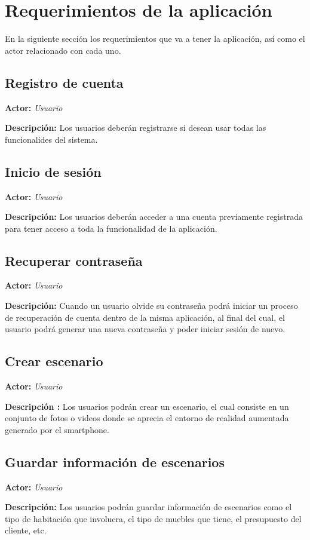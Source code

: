 \section{Requerimientos de la aplicación}
En la siguiente sección los requerimientos que va a tener la aplicación, así como el actor relacionado con cada uno.\par

\subsection{Registro de cuenta}
\textbf{Actor:} \textit{Usuario} \par
\textbf{Descripción:} Los usuarios deberán registrarse si desean usar todas las funcionalides del sistema.

\subsection{Inicio de sesión}
\textbf{Actor:} \textit{Usuario} \par
\textbf{Descripción:} Los usuarios deberán acceder a una cuenta previamente registrada para tener acceso a toda la funcionalidad de la aplicación.

\subsection{Recuperar contraseña}
\textbf{Actor:} \textit{Usuario} \par
\textbf{Descripción:} Cuando un usuario olvide su contraseña podrá iniciar un proceso de recuperación de cuenta dentro de la misma aplicación, al final del cual, el usuario podrá generar una nueva contraseña y poder iniciar sesión de nuevo.

\subsection{Crear escenario}
\textbf{Actor:} \textit{Usuario} \par
\textbf{Descripción :} Los usuarios podrán crear un escenario, el cual consiste en un conjunto de fotos o videos donde se aprecia el entorno de realidad aumentada generado por el smartphone.

\subsection{Guardar información de escenarios}
\textbf{Actor:} \textit{Usuario} \par
\textbf{Descripción:} Los usuarios podrán guardar información de escenarios como el tipo de habitación que involucra, el tipo de muebles que tiene, el presupuesto del cliente, etc.

